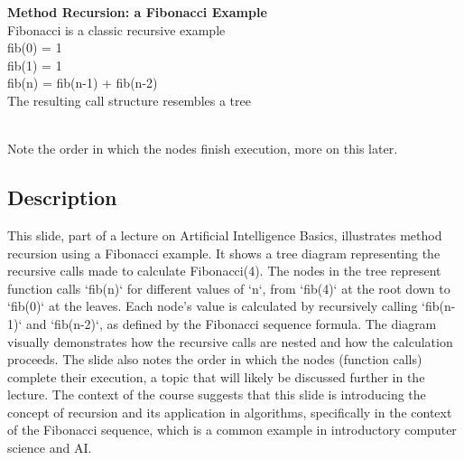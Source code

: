 \documentclass{article}%
\begin{document}
\textbf{Method Recursion: a Fibonacci Example} \\
Fibonacci is a classic recursive example \\
fib(0) = 1 \\
fib(1) = 1 \\
fib(n) = fib(n-1) + fib(n-2) \\
The resulting call structure resembles a tree \\
 \\
Note the order in which the nodes finish execution, more on this later.
%
\subsection{Description}%
This slide, part of a lecture on Artificial Intelligence Basics, illustrates method recursion using a Fibonacci example.  It shows a tree diagram representing the recursive calls made to calculate Fibonacci(4).  The nodes in the tree represent function calls `fib(n)` for different values of `n`, from `fib(4)` at the root down to `fib(0)` at the leaves.  Each node's value is calculated by recursively calling `fib(n-1)` and `fib(n-2)`, as defined by the Fibonacci sequence formula.  The diagram visually demonstrates how the recursive calls are nested and how the calculation proceeds.  The slide also notes the order in which the nodes (function calls) complete their execution, a topic that will likely be discussed further in the lecture.  The context of the course suggests that this slide is introducing the concept of recursion and its application in algorithms, specifically in the context of the Fibonacci sequence, which is a common example in introductory computer science and AI.%
\end{document}
